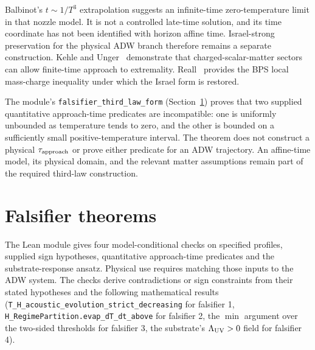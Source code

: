 \documentclass[prd,aps,twocolumn,floatfix,nofootinbib,superscriptaddress]{revtex4-2}
\newcommand{\Ladw}{\Lambda_{\rm UV}}
\begin{document}
Balbinot's $t \sim 1/T^3$ extrapolation suggests an infinite-time
zero-temperature limit in that nozzle model. It is not a controlled
late-time solution, and its time coordinate has not been identified
with horizon affine time. Israel-strong preservation for the physical
ADW branch therefore remains a separate construction. Kehle and
Unger~\cite{KehleUnger2022ThirdLaw} demonstrate that
charged-scalar-matter sectors can allow finite-time approach to
extremality. Reall~\cite{Reall2024ThirdLawBPS} provides the
BPS local mass-charge inequality under which the Israel form is
restored.

The module's \texttt{falsifier\_third\_law\_form}
(Section~\ref{sec:falsifiers}) proves that two supplied quantitative
approach-time predicates are incompatible: one is uniformly unbounded
as temperature tends to zero, and the other is bounded on a sufficiently
small positive-temperature interval. The theorem does not construct a
physical $\tau_{\rm approach}$ or prove either predicate for an ADW
trajectory. An affine-time model, its physical domain, and the relevant
matter assumptions remain part of the required third-law construction.

\section{Falsifier theorems}
\label{sec:falsifiers}

The Lean module gives four model-conditional checks on specified
profiles, supplied sign hypotheses, quantitative approach-time
predicates and the substrate-response ansatz. Physical use requires
matching those inputs to the ADW system. The checks derive
contradictions or sign constraints from their stated hypotheses and
the following mathematical results
(\texttt{T\_H\_acoustic\_evolution\_strict\_decreasing} for falsifier
1, \texttt{H\_RegimePartition.evap\_dT\_dt\_above} for falsifier 2,
the $\min$ argument over the two-sided thresholds for falsifier 3,
the substrate's $\Ladw > 0$ field for falsifier 4).
\end{document}
